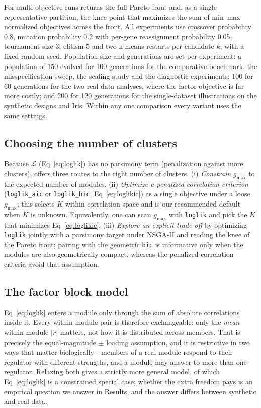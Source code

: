 For multi-objective runs \tool{} returns the full Pareto front and, as a single
representative partition, the knee point that maximizes the sum of min--max
normalized objectives across the front. All experiments use crossover probability 0.8, mutation probability 0.2 with per-gene reassignment probability 0.05, tournament size 3, elitism 5 and two k-means restarts per candidate $k$, with a fixed random seed. Population size and generations are set per experiment: a population of 150 evolved for 100 generations for the comparative benchmark, the misspecification sweep, the scaling study and the diagnostic experiments; 100 for 60 generations for the two real-data analyses, where the factor objective is far more costly; and 200 for 120 generations for the single-dataset illustrations on the synthetic designs and Iris. Within any one comparison every \tool{} variant uses the same settings.

\subsection*{Choosing the number of clusters}
Because $\mathcal{L}$ (Eq~\eqref{eq:loglik}) has no parsimony term (penalization against more clusters), \tool{} offers three routes to the right number of clusters. (i) \emph{Constrain} $g_{\max}$ to the expected number of modules. (ii) \emph{Optimize a penalized correlation criterion} (\texttt{loglik\_aic} or \texttt{loglik\_bic},
Eq~\eqref{eq:loglikic}) as a single objective under a loose $g_{\max}$; this
selects $K$ within correlation space and is our recommended default when $K$ is
unknown. Equivalently, one can scan $g_{\max}$ with \texttt{loglik} and pick the
$K$ that minimizes Eq~\eqref{eq:loglikic}. (iii) \emph{Explore an explicit
trade-off} by optimizing \texttt{loglik} jointly with a parsimony target under
NSGA-II and reading the knee of the Pareto front; pairing with the geometric
\texttt{bic} is informative only when the modules are also geometrically compact,
whereas the penalized correlation criteria avoid that assumption.

\subsection*{The factor block model}
\label{sec:factor}
Eq~\eqref{eq:loglik} enters a module only through the sum of absolute
correlations inside it. Every within-module pair is therefore exchangeable: only
the \emph{mean} within-module $\lvert r\rvert$ matters, not how it is distributed
across members. That is precisely the equal-magnitude $\pm$ loading assumption,
and it is restrictive in two ways that matter biologically---members of a real
module respond to their regulator with different strengths, and a module may
answer to more than one regulator. Relaxing both gives a strictly more general
model, of which Eq~\eqref{eq:loglik} is a constrained special case; whether the
extra freedom pays is an empirical question we answer in Results, and the answer
differs between synthetic and real data.


